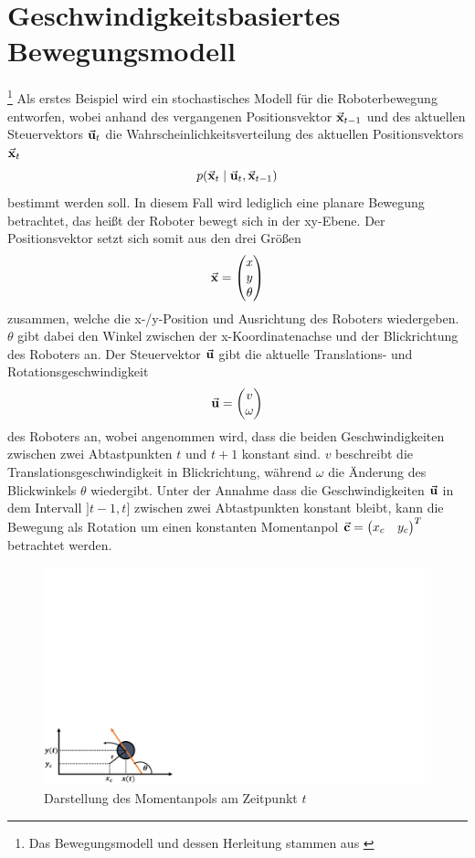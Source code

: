 \section{Geschwindigkeitsbasiertes Bewegungsmodell } \footnote{Das Bewegungsmodell und dessen Herleitung stammen aus \cite[S. 121 ff]{ProbRob}} 
Als erstes Beispiel wird ein stochastisches Modell für die Roboterbewegung entworfen, wobei anhand des vergangenen Positionsvektor $\vec{\mathbf{x}}_{t-1}$ und des aktuellen Steuervektors $\vec{\mathbf{u}}_t$ die Wahrscheinlichkeitsverteilung des aktuellen Positionsvektors $\vec{\mathbf{x}}_t$
\begin{equation}
p({\vec{\mathbf{x}}_t} \hspace{1mm} \vert \hspace{1mm} {\vec{\mathbf{u}}_t, \vec{\mathbf{x}}_{t-1}})
\end{equation}
bestimmt werden soll. In diesem Fall wird lediglich eine planare Bewegung betrachtet, das heißt der Roboter bewegt sich in der xy-Ebene. Der Positionsvektor setzt sich somit aus den drei Größen
\begin{equation}
\vec{\mathbf{x}} = \begin{pmatrix}
x \\ y \\ \theta
\end{pmatrix}
\end{equation}
zusammen, welche die x-/y-Position und Ausrichtung des Roboters wiedergeben. $\theta$ gibt dabei den Winkel zwischen der x-Koordinatenachse und der Blickrichtung des Roboters an.
Der Steuervektor $\vec{\mathbf{u}}$ gibt die aktuelle Translations- und Rotationsgeschwindigkeit
\begin{equation}
\vec{\mathbf{u}} = \begin{pmatrix}
v \\ \omega
\end{pmatrix}
\end{equation}
des Roboters an, wobei angenommen wird, dass die beiden Geschwindigkeiten zwischen zwei Abtastpunkten $t$ und $t+1$ konstant sind. $v$ beschreibt die Translationsgeschwindigkeit in Blickrichtung, während $\omega$ die Änderung des Blickwinkels $\theta$ wiedergibt.
Unter der Annahme dass die Geschwindigkeiten $\vec{\mathbf{u}}$ in dem Intervall $]t-1, t]$ zwischen zwei Abtastpunkten konstant bleibt, kann die Bewegung als Rotation um einen konstanten Momentanpol $\vec{\mathbf{c}} = \begin{pmatrix} x_c & y_c \end{pmatrix}^T$ betrachtet werden.
\begin{figure}[!ht]
\centering
\includegraphics[width=0.6\linewidth, trim={0cm 0cm 24cm 14cm}, clip]{img/Bild_Kinematik_1}
\caption{Darstellung des Momentanpols am Zeitpunkt $t$ \cite[S. 126]{ProbRob}}
\end{figure}

